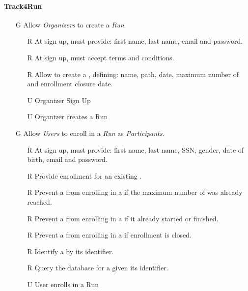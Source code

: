 \documentclass[../../../rasd.tex]{subfiles}
\begin{document}
\paragraph{Track4Run}
\begin{itemize}
    \item[G\subs{8}]Allow \textit{Organizers} to create a \textit{Run}.
    \begin{itemize}
        \item[R\subs{39}]At sign up,  must provide: first name, last name, email and password.
        \item[R\subs{40}]At sign up,  must accept terms and conditions.
        \item[R\subs{41}]Allow  to create a , defining: name, path, date, maximum number of  and enrollment closure date. 
        \\
        \item[U\subs{13}]Organizer Sign Up  
        \item[U\subs{14}]Organizer creates a Run
    \end{itemize}

    \item[G\subs{9}]Allow \textit{Users} to enroll in a \textit{Run} as \textit{Participants}. 
    \begin{itemize}
    \item[R\subs{2}]At sign up,  must provide: first name, last name, SSN, gender, date of birth, email and password.
        \item[R\subs{42}]Provide  enrollment for an existing .
        \item[R\subs{43}]Prevent a  from enrolling in a  if the maximum number of  was already reached.
        \item[R\subs{44}]Prevent a  from enrolling in a  if it already started or finished.
        \item[R\subs{45}]Prevent a  from enrolling in a  if enrollment is closed.
        \item[R\subs{47}]Identify a  by its identifier.
        \item[R\subs{48}]Query the database for a  given its identifier.
        \\
        \item[U\subs{15}]User enrolls in a Run
    \end{itemize}


\end{itemize}
\end{document}
